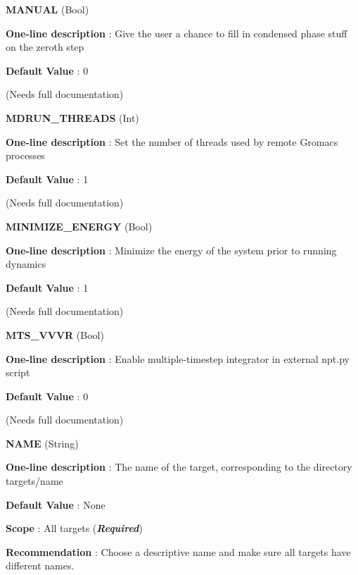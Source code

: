 \begin{DoxyItemize}
\item {\bfseries  \-M\-A\-N\-U\-A\-L } (\-Bool) \par
{\bfseries  \-One-\/line description }\-: \-Give the user a chance to fill in condensed phase stuff on the zeroth step \par
{\bfseries  \-Default \-Value }\-: 0 \par
(\-Needs full documentation)\end{DoxyItemize}
\begin{DoxyItemize}
\item {\bfseries  \-M\-D\-R\-U\-N\-\_\-\-T\-H\-R\-E\-A\-D\-S } (\-Int) \par
{\bfseries  \-One-\/line description }\-: \-Set the number of threads used by remote \-Gromacs processes \par
{\bfseries  \-Default \-Value }\-: 1 \par
(\-Needs full documentation)\end{DoxyItemize}
\begin{DoxyItemize}
\item {\bfseries  \-M\-I\-N\-I\-M\-I\-Z\-E\-\_\-\-E\-N\-E\-R\-G\-Y } (\-Bool) \par
{\bfseries  \-One-\/line description }\-: \-Minimize the energy of the system prior to running dynamics \par
{\bfseries  \-Default \-Value }\-: 1 \par
(\-Needs full documentation)\end{DoxyItemize}
\begin{DoxyItemize}
\item {\bfseries  \-M\-T\-S\-\_\-\-V\-V\-V\-R } (\-Bool) \par
{\bfseries  \-One-\/line description }\-: \-Enable multiple-\/timestep integrator in external npt.\-py script \par
{\bfseries  \-Default \-Value }\-: 0 \par
(\-Needs full documentation)\end{DoxyItemize}
\begin{DoxyItemize}
\item {\bfseries  \-N\-A\-M\-E } (\-String) \par
{\bfseries  \-One-\/line description }\-: \-The name of the target, corresponding to the directory targets/name \par
{\bfseries  \-Default \-Value }\-: \-None \par
{\bfseries  \-Scope }\-: \-All targets ({\bfseries {\itshape \-Required\/}}) \par
{\bfseries  \-Recommendation }\-: \-Choose a descriptive name and make sure all targets have different names.\end{DoxyItemize}
